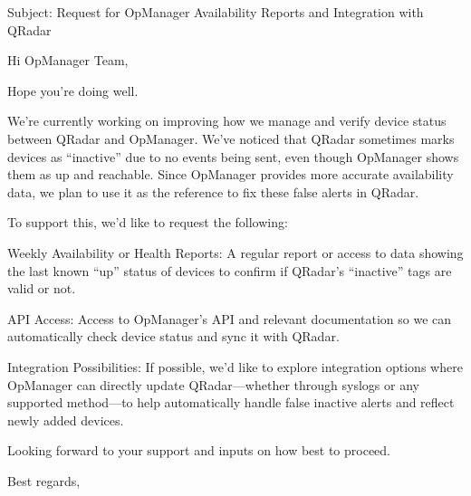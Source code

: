 Subject: Request for OpManager Availability Reports and Integration with QRadar

Hi OpManager Team,

Hope you're doing well.

We’re currently working on improving how we manage and verify device status between QRadar and OpManager. We’ve noticed that QRadar sometimes marks devices as “inactive” due to no events being sent, even though OpManager shows them as up and reachable. Since OpManager provides more accurate availability data, we plan to use it as the reference to fix these false alerts in QRadar.

To support this, we’d like to request the following:

Weekly Availability or Health Reports:
A regular report or access to data showing the last known “up” status of devices to confirm if QRadar’s “inactive” tags are valid or not.

API Access:
Access to OpManager’s API and relevant documentation so we can automatically check device status and sync it with QRadar.

Integration Possibilities:
If possible, we’d like to explore integration options where OpManager can directly update QRadar—whether through syslogs or any supported method—to help automatically handle false inactive alerts and reflect newly added devices.

Looking forward to your support and inputs on how best to proceed.

Best regards,
